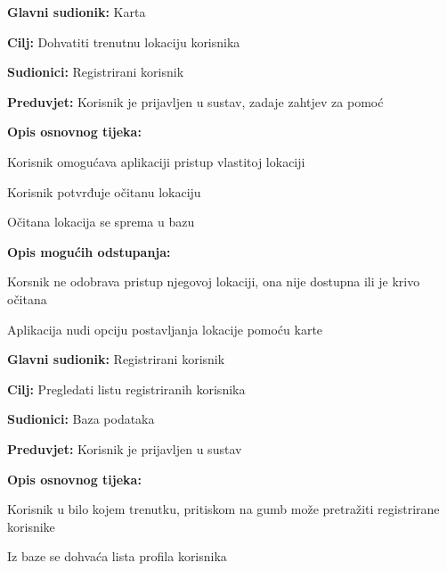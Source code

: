 \noindent {}
\begin{packed_item}
	\item \textbf{Glavni sudionik: } Karta
	\item  \textbf{Cilj:} Dohvatiti trenutnu lokaciju korisnika
	\item  \textbf{Sudionici:} Registrirani korisnik
	\item  \textbf{Preduvjet:} Korisnik je prijavljen u sustav, zadaje zahtjev za pomoć
	\item  \textbf{Opis osnovnog tijeka:}
	\item[] \begin{packed_enum}
		\item Korisnik omogućava aplikaciji pristup vlastitoj lokaciji
		\item Korisnik potvrđuje očitanu lokaciju
		\item Očitana lokacija se sprema u bazu
	\end{packed_enum}
	\item  \textbf{Opis mogućih odstupanja:}
	\item[] \begin{packed_item}
		\item[1.a] Korsnik ne odobrava pristup njegovoj lokaciji, ona nije dostupna ili je krivo očitana
		\item[] \begin{packed_enum}
			\item Aplikacija nudi opciju postavljanja lokacije pomoću karte
		\end{packed_enum}
	\end{packed_item}
\end{packed_item}

\noindent {}
\begin{packed_item}
	\item \textbf{Glavni sudionik: }Registrirani korisnik
	\item  \textbf{Cilj:} Pregledati listu registriranih korisnika
	\item  \textbf{Sudionici:} Baza podataka
	\item  \textbf{Preduvjet:} Korisnik je prijavljen u sustav
	\item  \textbf{Opis osnovnog tijeka:}
	\item[] \begin{packed_enum}
		\item Korisnik u bilo kojem trenutku, pritiskom na gumb može pretražiti registrirane korisnike
		\item Iz baze se dohvaća lista profila korisnika
	\end{packed_enum}
\end{packed_item}

